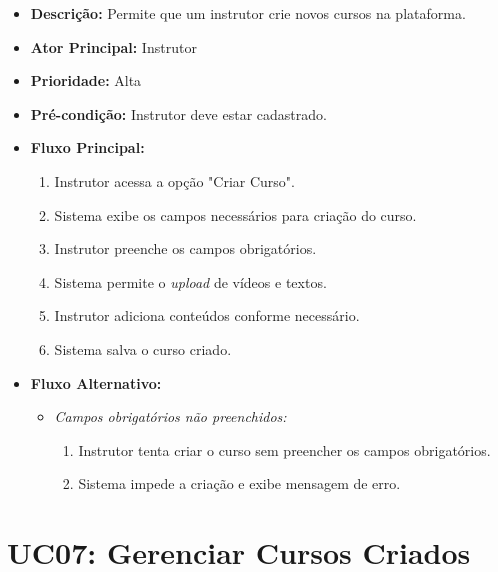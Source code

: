         \begin{itemize}
            \item \textbf{Descrição:} Permite que um instrutor crie novos cursos na plataforma.
            
            \item \textbf{Ator Principal:} Instrutor
            
            \item \textbf{Prioridade:} Alta
            
            \item \textbf{Pré-condição:} Instrutor deve estar cadastrado.
            
            \item \textbf{Fluxo Principal:}
            \begin{enumerate}
                \item Instrutor acessa a opção "Criar Curso".
                \item Sistema exibe os campos necessários para criação do curso.
                \item Instrutor preenche os campos obrigatórios.
                \item Sistema permite o \textit{upload} de vídeos e textos.
                \item Instrutor adiciona conteúdos conforme necessário.
                \item Sistema salva o curso criado.
            \end{enumerate}

            \item \textbf{Fluxo Alternativo:}
            \begin{itemize}
                \item \textit{Campos obrigatórios não preenchidos:}
                \begin{enumerate}
                    \item Instrutor tenta criar o curso sem preencher os campos obrigatórios.
                    \item Sistema impede a criação e exibe mensagem de erro.
                \end{enumerate}
            \end{itemize}
        \end{itemize}

        \section*{UC07: Gerenciar Cursos Criados}

